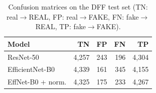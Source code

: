 \begin{table}[!t]
\centering
\caption{Confusion matrices on the DFF test set (TN: real$\to$REAL, FP: real$\to$FAKE, FN: fake$\to$REAL, TP: fake$\to$FAKE).}
\label{tab:confusion}
\begin{tabular}{lrrrr}
\toprule
Model & TN & FP & FN & TP \\
\midrule
ResNet-50 & 4,257 & 243 & 196 & 4,304 \\
EfficientNet-B0 & 4,339 & 161 & 345 & 4,155 \\
EffNet-B0 + norm. & 4,325 & 175 & 233 & 4,267 \\
\bottomrule
\end{tabular}
\end{table}
